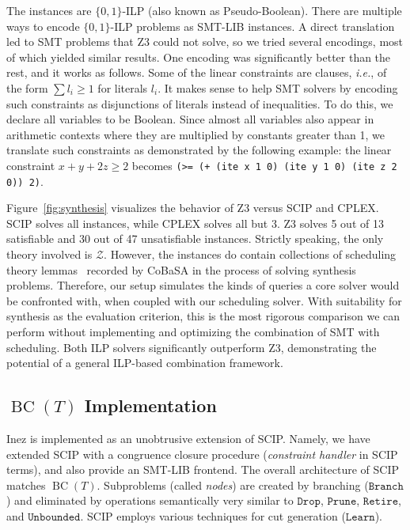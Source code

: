 \documentclass{llncs}
\newcommand{\cobasa}[0]{\textsf{CoBaSA}}
\newcommand{\inez}[0]{\textsf{Inez}}
\newcommand{\comment}[1]{}
\newcommand{\ie}[0]{\emph{i.e.}, }
\newcommand{\tr}[1]{\ensuremath{\mathtt{#1}}}
\newcommand{\Z}[0]{\ensuremath{\mathcal{Z}}}
\newcommand{\bct}[0]{\ensuremath{\operatorname{BC}(T)}}
\begin{document}
The instances are $\{0, 1\}$-ILP (also known as Pseudo-Boolean). There
are multiple ways to encode $\{0, 1\}$-ILP problems as SMT-LIB
instances. A direct translation led to SMT problems that Z3 could not
solve, so we tried several encodings, most of which yielded similar
results. One encoding was significantly better than the rest, and it
works as follows. Some of the linear constraints are clauses, \ie of
the form $\sum l_i \geq 1$ for literals $l_i$. It makes sense to help
SMT solvers by encoding such constraints as disjunctions of literals
instead of inequalities. To do this, we declare all variables to be
Boolean. Since almost all variables also appear in arithmetic contexts
where they are multiplied by constants greater than 1, we translate
such constraints as demonstrated by the following example: the linear
constraint $x + y + 2 z \geq 2$ becomes \texttt{(>= (+ (ite x 1 0)
  (ite y 1 0) (ite z 2 0)) 2)}.



Figure~\ref{fig:synthesis} visualizes the behavior of Z3 versus SCIP
and CPLEX. SCIP solves all instances, while CPLEX solves all but 3. Z3
solves 5 out of 13 satisfiable and 30 out of 47 unsatisfiable
instances. Strictly speaking, the only theory involved is
\Z{}. However, the instances do contain collections of scheduling
theory lemmas~\cite{hmp11} recorded by \cobasa{} in the process of
solving synthesis problems.  Therefore, our setup simulates the kinds
of queries a core solver would be confronted with, when coupled with
our scheduling solver. With suitability for synthesis as the
evaluation criterion, this is the most rigorous comparison we can
perform without implementing and optimizing the combination of SMT
with scheduling. Both ILP solvers significantly outperform Z3,
demonstrating the potential of a general ILP-based combination
framework.

\comment{Recall that with the direct encoding of the ILP problems, Z3
  failed to solve any of the instances above. It was only after we
  experimented with several encodings that we found an encoding that
  allowed Z3 to solve some of the problems. The ILP solvers did not
  require special encodings.}

\subsection{\bct{} Implementation}
\label{ssec:implementation}

\inez{} is implemented as an unobtrusive extension of SCIP.  Namely,
we have extended SCIP with a congruence closure procedure
(\emph{constraint handler} in SCIP terms), and also provide an SMT-LIB
frontend. The overall architecture of SCIP matches \bct{}. Subproblems
(called \emph{nodes}) are created by branching (\tr{Branch}) and
eliminated by operations semantically very similar to \tr{Drop},
\tr{Prune}, \tr{Retire}, and \tr{Unbounded}. SCIP employs various
techniques for cut generation (\tr{Learn}).
\end{document}
